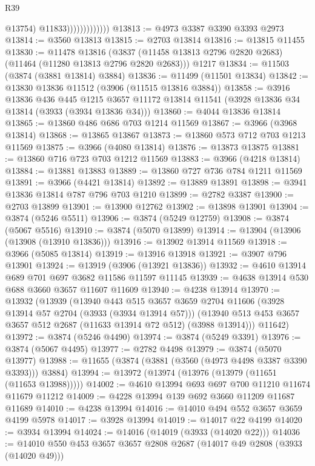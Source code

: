 \begin{lexlean}{R39}
\begin{coremodule}
                                @13754)
                              @11833)))))))))))))
@13813 := @4973 @3387 @3390 @3393 @2973
@13814 := @3560 @13813
@13815 := @2703 @13814
@13816 := @13815 @11455
@13830 := @11478
    @13816
    (@3837 (@11458 @13813 @2796 @2820 @2683) (@11464 (@11280 @13813 @2796 @2820 @2683)))
    @1217
@13834 := @11503 (@3874 (@3881 @13814) @3884)
@13836 := @11499 (@11501 @13834)
@13842 := @13830 @13836 @11512 (@3906 (@11515 @13816 @3884))
@13858 := @3916
    @13836
    @436
    @445
    @1215
    @3657
    @11172
    @13814
    @11541
    (@3928 @13836 @34 @13814 (@3933 (@3934 @13836 @34)))
@13860 := @4044 @13836 @13814
@13865 := @13860 @486 @686 @703 @1214 @11569
@13867 := @3966 (@3968 @13814)
@13868 := @13865 @13867
@13873 := @13860 @573 @712 @703 @1213 @11569
@13875 := @3966 (@4080 @13814)
@13876 := @13873 @13875
@13881 := @13860 @716 @723 @703 @1212 @11569
@13883 := @3966 (@4218 @13814)
@13884 := @13881 @13883
@13889 := @13860 @727 @736 @784 @1211 @11569
@13891 := @3966 (@4421 @13814)
@13892 := @13889 @13891
@13898 := @3941 @13836 @13814 @787 @796 @703 @1210
@13899 := @2782 @3387
@13900 := @2703 @13899
@13901 := @13900 @12762
@13902 := @13898 @13901
@13904 := @3874 (@5246 @5511)
@13906 := @3874 (@5249 @12759)
@13908 := @3874 (@5067 @5516)
@13910 := @3874 (@5070 @13899)
@13914 := @13904 (@13906 (@13908 (@13910 @13836)))
@13916 := @13902 @13914 @11569
@13918 := @3966 (@5085 @13814)
@13919 := @13916 @13918
@13921 := @3907 @796 @13901
@13924 := @13919 (@3906 (@13921 @13836))
@13932 := @4610 @13914 @689 @701 @697 @3682 @11586 @11597 @11145
@13939 := @4638 @13914 @530 @688 @3660 @3657 @11607 @11609
@13940 := @4238 @13914
@13970 := @13932
    (@13939
      (@13940
        @443
        @515
        @3657
        @3659
        @2704
        @11606
        (@3928 @13914 @57 @2704 (@3933 (@3934 @13914 @57)))
        (@13940 @513 @453 @3657 @3657 @512 @2687 (@11633 @13914 @72 @512) (@3988 @13914)))
      @11642)
@13972 := @3874 (@5246 @4490)
@13974 := @3874 (@5249 @3391)
@13976 := @3874 (@5067 @4495)
@13977 := @2782 @4498
@13979 := @3874 (@5070 @13977)
@13988 := @11655 (@3874 (@3881 (@3560 (@4973 @4498 @3387 @3390 @3393))) @3884)
@13994 := @13972 (@13974 (@13976 (@13979 (@11651 (@11653 @13988)))))
@14002 := @4610 @13994 @693 @697 @700 @11210 @11674 @11679 @11212
@14009 := @4228 @13994 @139 @692 @3660 @11209 @11687 @11689
@14010 := @4238 @13994
@14016 := @14010 @494 @552 @3657 @3659 @4199 @5978
@14017 := @3928 @13994
@14019 := @14017 @22 @4199
@14020 := @3934 @13994
@14024 := @14016 (@14019 (@3933 (@14020 @22)))
@14036 := @14010 @550 @453 @3657 @3657 @2808 @2687 (@14017 @49 @2808 (@3933 (@14020 @49)))

\end{coremodule}
\end{lexlean}
